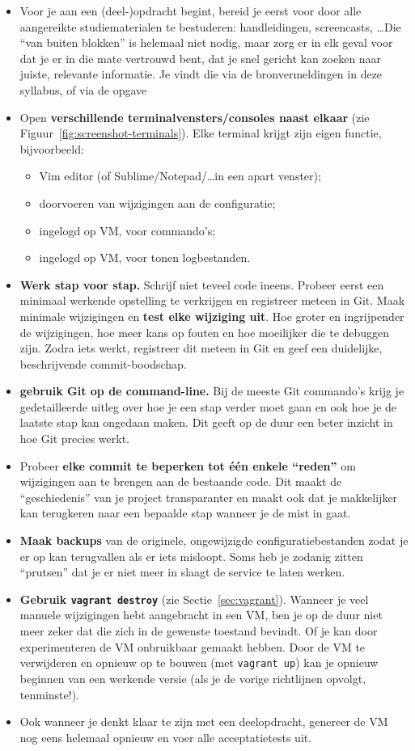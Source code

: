 \begin{itemize}
  \item Voor je aan een (deel-)opdracht begint, bereid je eerst voor door alle aangereikte studiematerialen te bestuderen: handleidingen, screencasts, \ldots Die ``van buiten blokken'' is helemaal niet nodig, maar zorg er in elk geval voor dat je er in die mate vertrouwd bent, dat je snel gericht kan zoeken naar juiste, relevante informatie. Je vindt die via de bronvermeldingen in deze syllabus, of via de opgave
  \item Open \textbf{verschillende terminalvensters/consoles naast elkaar} (zie Figuur~\ref{fig:screenshot-terminals}). Elke terminal krijgt zijn eigen functie, bijvoorbeeld:
    \begin{itemize}
      \item Vim editor (of Sublime/Notepad/\ldots in een apart venster);
      \item doorvoeren van wijzigingen aan de configuratie;
      \item ingelogd op VM, voor commando's;
      \item ingelogd op VM, voor tonen logbestanden.
    \end{itemize}
  \item \textbf{Werk stap voor stap.} Schrijf niet teveel code ineens. Probeer eerst een minimaal werkende opstelling te verkrijgen en registreer meteen in Git. Maak minimale wijzigingen en \textbf{test elke wijziging uit}. Hoe groter en ingrijpender de wijzigingen, hoe meer kans op fouten en hoe moeilijker die te debuggen zijn. Zodra iets werkt, registreer dit meteen in Git en geef een duidelijke, beschrijvende commit-boodschap.
  \item \textbf{gebruik Git op de command-line.} Bij de meeste Git commando's krijg je gedetailleerde uitleg over hoe je een stap verder moet gaan en ook hoe je de laatste stap kan ongedaan maken. Dit geeft op de duur een beter inzicht in hoe Git precies werkt.
  \item Probeer \textbf{elke commit te beperken tot één enkele ``reden''} om wijzigingen aan te brengen aan de bestaande code. Dit maakt de ``geschiedenis'' van je project transparanter en maakt ook dat je makkelijker kan terugkeren naar een bepaalde stap wanneer je de mist in gaat.
  \item \textbf{Maak backups} van de originele, ongewijzigde configuratiebestanden zodat je er op kan terugvallen als er iets misloopt. Soms heb je zodanig zitten ``prutsen'' dat je er niet meer in slaagt de service te laten werken.
  \item \textbf{Gebruik \texttt{vagrant destroy}} (zie Sectie~\ref{sec:vagrant}). Wanneer je veel manuele wijzigingen hebt aangebracht in een VM, ben je op de duur niet meer zeker dat die zich in de gewenste toestand bevindt. Of je kan door experimenteren de VM onbruikbaar gemaakt hebben. Door de VM te verwijderen en opnieuw op te bouwen (met \texttt{vagrant up}) kan je opnieuw beginnen van een werkende versie (als je de vorige richtlijnen opvolgt, tenminste!).
  \item Ook wanneer je denkt klaar te zijn met een deelopdracht, genereer de VM nog eens helemaal opnieuw en voer alle acceptatietests uit.
\end{itemize}


